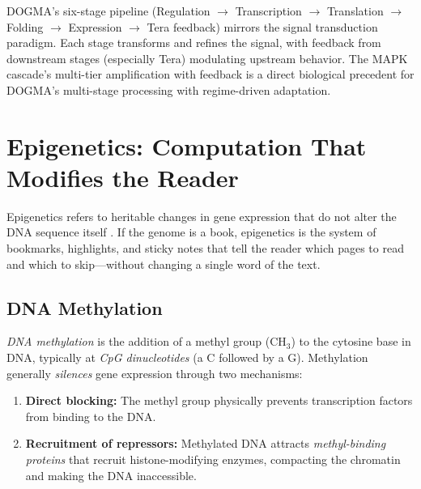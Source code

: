 \begin{keyinsight}
DOGMA's six-stage pipeline (Regulation $\to$ Transcription $\to$ Translation $\to$ Folding $\to$ Expression $\to$ Tera feedback) mirrors the signal transduction paradigm. Each stage transforms and refines the signal, with feedback from downstream stages (especially Tera) modulating upstream behavior. The MAPK cascade's multi-tier amplification with feedback is a direct biological precedent for DOGMA's multi-stage processing with regime-driven adaptation.
\end{keyinsight}

\section{Epigenetics: Computation That Modifies the Reader}
\label{sec:epigenetics}

Epigenetics refers to heritable changes in gene expression that do not alter the DNA sequence itself \citep{allis2016}. If the genome is a book, epigenetics is the system of bookmarks, highlights, and sticky notes that tell the reader which pages to read and which to skip---without changing a single word of the text.

\subsection{DNA Methylation}

\emph{DNA methylation} is the addition of a methyl group ($\text{CH}_3$) to the cytosine base in DNA, typically at \emph{CpG dinucleotides} (a C followed by a G). Methylation generally \emph{silences} gene expression through two mechanisms:

\begin{enumerate}[leftmargin=1.8em]
  \item \textbf{Direct blocking:} The methyl group physically prevents transcription factors from binding to the DNA.
  \item \textbf{Recruitment of repressors:} Methylated DNA attracts \emph{methyl-binding proteins} that recruit histone-modifying enzymes, compacting the chromatin and making the DNA inaccessible.
\end{enumerate}

